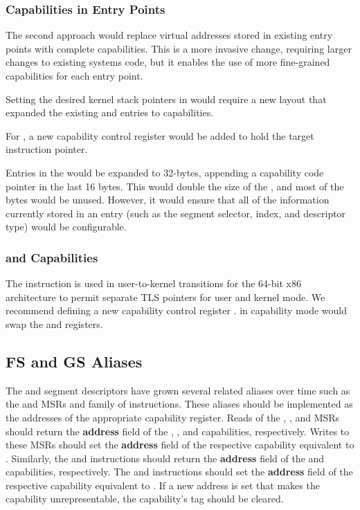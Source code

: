 \subsubsection{Capabilities in Entry Points}

The second approach would replace virtual addresses stored in
existing entry points with complete capabilities.  This is a more
invasive change, requiring larger changes to existing systems code, but
it enables the use of more fine-grained capabilities for each entry
point.

Setting the desired kernel stack pointers in \CSP{} would require a new
\TSS{} layout that expanded the existing \RSP{} and \IST{} entries to
capabilities.

For , a new capability control register \CSTAR{} would be
added to hold the target instruction pointer.

Entries in the \IDT{} would be expanded to 32-bytes, appending a capability
code pointer in the last 16 bytes.  This would double the size of the
\IDT{}, and most of the bytes would be unused.  However, it would
ensure that all of the information currently stored in an \IDT{} entry
(such as the segment selector, \IST{} index, and descriptor type) would
be configurable.

\subsubsection{ and Capabilities}

The  instruction is used in user-to-kernel
transitions for the 64-bit x86 architecture to permit separate TLS
pointers for user and kernel mode.  We recommend defining a new
capability control register \KGS{}.   in capability
mode would swap the \CGS{} and \KGS{} registers.

\subsection{FS and GS Aliases}

The \FS{} and \GS{} segment descriptors have grown several related
aliases over time such as the \FSBASE{} and \GSBASE{} MSRs and
 family of instructions.  These aliases should be
implemented as the addresses of the appropriate capability register.
Reads of the \FSBASE{}, \GSBASE{}, and \KGSBASE{} MSRs should return
the \textbf{address} field of the \CFS{}, \CGS{}, and \KGS{} capabilities,
respectively.  Writes to these MSRs should set the \textbf{address} field of the
respective capability equivalent to .  Similarly,
the  and  instructions should
return the \textbf{address} field of the \CFS{} and \CGS{} capabilities,
respectively.  The  and 
instructions should set the \textbf{address} field of the respective capability
equivalent to .  If a new address is set that makes
the capability unrepresentable, the capability's tag should be
cleared.

